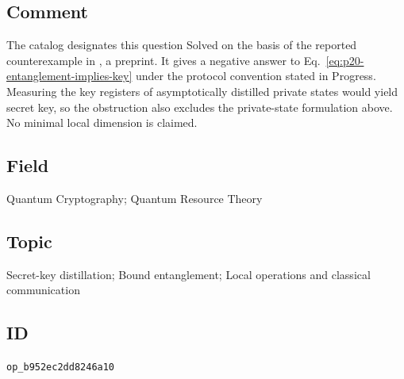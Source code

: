 \subsection*{Comment}

The catalog designates this question Solved on the basis of the reported
  counterexample in , a preprint.
  It gives a negative answer to Eq.~\eqref{eq:p20-entanglement-implies-key}
  under the protocol convention stated in Progress. Measuring the key registers of asymptotically
  distilled private states would yield secret key, so the obstruction also
  excludes the private-state formulation above. No minimal local dimension
  is claimed.

\subsection*{Field}

Quantum Cryptography; Quantum Resource Theory

\subsection*{Topic}

Secret-key distillation; Bound entanglement; Local operations and classical communication

\subsection*{ID}

\texttt{op\_b952ec2dd8246a10}
